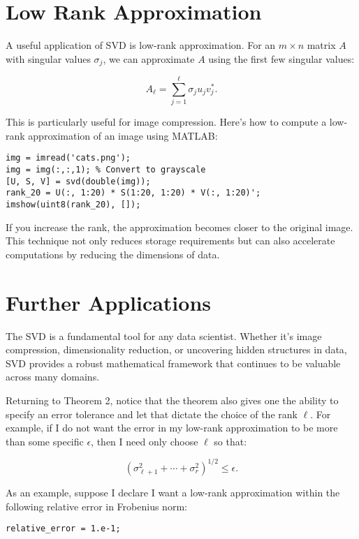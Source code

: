 \documentclass{ximera}
\begin{document}
\begin{problem}
\begin{problem}
\section{Low Rank Approximation}

A useful application of SVD is low-rank approximation. For an \( m \times n \) matrix \( A \) with singular values \( \sigma_j \), we can approximate \( A \) using the first few singular values:

\[
A_\ell = \sum_{j=1}^\ell \sigma_j u_j v_j^*.
\]

This is particularly useful for image compression. Here’s how to compute a low-rank approximation of an image using MATLAB:

\begin{verbatim}
img = imread('cats.png');
img = img(:,:,1); % Convert to grayscale
[U, S, V] = svd(double(img));
rank_20 = U(:, 1:20) * S(1:20, 1:20) * V(:, 1:20)';
imshow(uint8(rank_20), []);
\end{verbatim}

If you increase the rank, the approximation becomes closer to the original image. This technique not only reduces storage requirements but can also accelerate computations by reducing the dimensions of data.

\section{Further Applications}

The SVD is a fundamental tool for any data scientist. Whether it’s image compression, dimensionality reduction, or uncovering hidden structures in data, SVD provides a robust mathematical framework that continues to be valuable across many domains.

Returning to Theorem 2, notice that the theorem also gives one the ability to specify an error tolerance and let that dictate the choice of the rank \( \ell \). For example, if I do not want the error in my low-rank approximation to be more than some specific \( \epsilon \), then I need only choose \( \ell \) so that:

\[
\left( \sigma_{\ell+1}^2 + \cdots + \sigma_{r}^2 \right)^{1/2} \leq \epsilon.
\]

As an example, suppose I declare I want a low-rank approximation within the following relative error in Frobenius norm:

\begin{verbatim}
relative_error = 1.e-1;
\end{verbatim}


\end{problem}
\end{problem}
\end{document}
